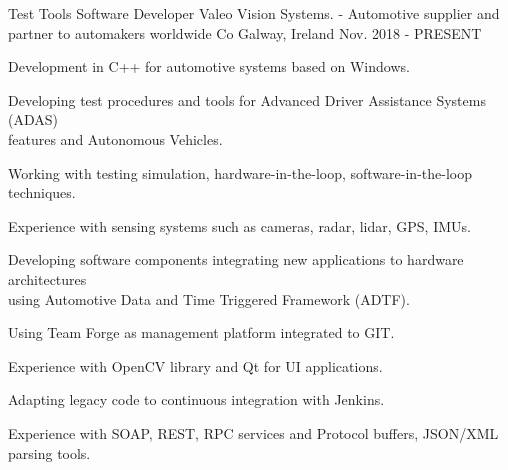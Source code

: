 

\begin{cventries}

  \cventry
    {Test Tools Software Developer} %
    {Valeo Vision Systems. - Automotive supplier and partner to automakers worldwide} %
    {Co Galway, Ireland} %
    {Nov. 2018 - PRESENT} %
    {
      \begin{cvitems} %
        \item {Development in C++ for automotive systems based on Windows.}
        \item {Developing test procedures and tools for Advanced Driver Assistance Systems (ADAS)\\
    features and Autonomous Vehicles.}
        \item {Working with testing simulation, hardware-in-the-loop, software-in-the-loop techniques.}
        \item {Experience with sensing systems such as cameras, radar, lidar, GPS, IMUs.}
        \item {Developing software components integrating new applications to hardware architectures\\
     using Automotive Data and Time Triggered Framework (ADTF).}
        \item {Using Team Forge as management platform integrated to GIT.}
        \item {Experience with OpenCV library and Qt for UI applications.}
        \item {Adapting legacy code to continuous integration with Jenkins.}
        \item {Experience with SOAP, REST, RPC services and Protocol buffers, JSON/XML parsing tools.}
      \end{cvitems}
    }


\end{cventries}
